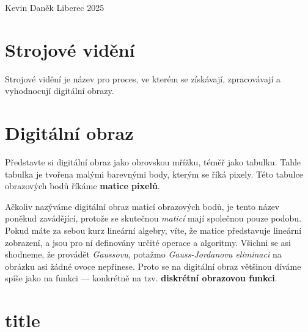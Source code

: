 \documentclass[a4paper, 12pt,twoside,FM]{article}
\begin{document}
{Kevin Daněk}
{Liberec 2025}

\section{Strojové vidění}
Strojové vidění je název pro proces, ve kterém se získávají, zpracovávají a vyhodnocují digitální obrazy.

\section{Digitální obraz}
Představte si digitální obraz jako obrovskou mřížku, téměř jako tabulku. Tahle tabulka je tvořena malými barevnými body, kterým se říká pixely. Této tabulce obrazových bodů říkáme \textbf{matice pixelů}.

Ačkoliv nazýváme digitální obraz maticí obrazových bodů, je tento název poněkud zavádějící, protože se skutečnou \textit{maticí} mají společnou pouze podobu. Pokud máte za sebou kurz lineární algebry, víte, že matice představuje lineární zobrazení, a jsou pro ní definovány určité operace a algoritmy. Všichni se asi shodneme, že provádět \textit{Gaussovu}, potažmo \textit{Gauss-Jordanovu eliminaci} na obrázku asi žádné ovoce nepřinese. Proto se na digitální obraz většinou díváme spíše jako na funkci — konkrétně na tzv. \textbf{diskrétní obrazovou funkci}.

\section{title}
\end{document}
